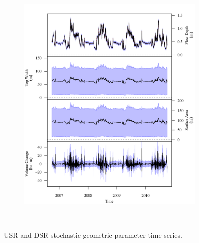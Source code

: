 \begin{linenumbers}
\subfiguremid
\begin{landscape}
	\begin{figure}
		\begin{subfigure}{0.7\textwidth}
			\centering
			\includegraphics[width=\tableCustomSize]{"Figures/Results_USR/Stochastic/G TS E"}
			\label{sub:GeoTS_E}	
		\end{subfigure}\\
		\caption{USR and DSR stochastic geometric parameter time-series.}
	\end{figure}
\end{landscape}


\end{linenumbers}
